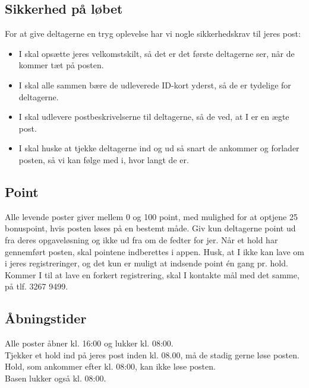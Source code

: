 \subsection{Sikkerhed på løbet}
For at give deltagerne en tryg oplevelse har vi nogle sikkerhedskrav til jeres post:
\begin{itemize}
  \item I skal opsætte jeres velkomstskilt, så det er det første deltagerne ser, når de kommer tæt på posten.
  \item I skal alle sammen bære de udleverede ID-kort yderst, så de er tydelige for deltagerne.
  \item I skal udlevere postbeskrivelserne til deltagerne, så de ved, at I er en ægte post.
  \item I skal huske at tjekke deltagerne ind og ud så snart de ankommer og forlader posten, så vi kan følge med i, hvor langt de er.
\end{itemize}
\subsection{Point}
Alle levende poster giver mellem 0 og 100 point, med mulighed for at optjene 25 bonuspoint, hvis posten løses på en bestemt måde. Giv kun deltagerne point ud fra deres opgaveløsning og ikke ud fra om de fedter for jer. Når et hold har gennemført posten, skal pointene indberettes i appen. Husk, at I ikke kan lave om i jeres registreringer, og det kun er muligt at indsende point én gang pr. hold.\\
\newline
Kommer I til at lave en forkert registrering, skal I kontakte mål med det samme, på tlf. 3267 9499.
\subsection{Åbningstider}
Alle poster åbner kl. 16:00 og lukker kl. 08:00.\\
Tjekker et hold ind på jeres post inden kl. 08.00, må de stadig gerne løse posten.\\
Hold, som ankommer efter kl. 08:00, kan ikke løse posten.\\
Basen lukker også kl. 08:00.
